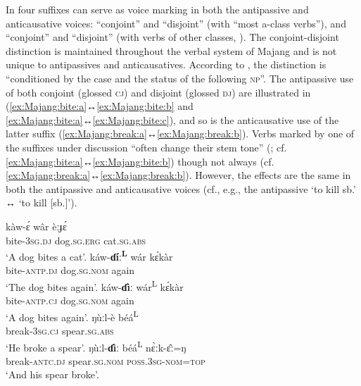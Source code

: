 In  four suffixes can serve as voice marking in both the antipassive and anticausative voices: “conjoint”  and “disjoint”  (with “most a-class verbs”), and “conjoint”  and “disjoint”  (with verbs of other  classes, \citealt[227]{joswig:2019}). The conjoint-disjoint distinction is maintained throughout the verbal system of Majang and is not unique to antipassives and anticausatives. According to \cite[132]{joswig:2019}, the distinction is “conditioned by the case and the  status of the following \textsc{np}”. The antipassive use of both conjoint  (glossed \textsc{cj}) and disjoint  (glossed \textsc{dj}) are illustrated in (\ref{ex:Majang:bite:a}↔\ref{ex:Majang:bite:b} and \ref{ex:Majang:bite:a}↔\ref{ex:Majang:bite:c}), and so is the anticausative use of the latter suffix (\ref{ex:Majang:break:a}↔\ref{ex:Majang:break:b}). Verbs marked by one of the suffixes under discussion “often change their stem tone” (\citealt[229]{joswig:2019}; cf. \ref{ex:Majang:bite:a}↔\ref{ex:Majang:bite:b}) though not always (cf. \ref{ex:Majang:break:a}↔\ref{ex:Majang:break:b}). However, the effects are the same in both the antipassive and anticausative voices (cf., e.g., the antipassive   ‘to kill sb.’ ↔  ‘to kill [sb.]’). 

\ea {} \citep[228, 361]{joswig:2019}
\ea\label{ex:Majang:bite:a}
	\gll	kàw-ɛ́ wâr èːɟɛ́ \\
			bite-\textsc{3sg.dj} dog.\textsc{sg.erg} cat.\textsc{sg.abs} \\
	\glt	‘A dog bites a cat’.
\ex\label{ex:Majang:bite:b}
	\gll	káw-\textbf{ɗíː\textsuperscript{L}} wár kɛ́kàr \\
			bite-\textsc{antp.dj} dog.\textsc{sg.nom} again \\
	\glt	‘The dog bites again’.
\ex\label{ex:Majang:bite:c}
	\gll	káw-\textbf{ɗìː} wár\textsuperscript{L} kɛ́kàr \\
			bite-\textsc{antp.cj} dog.\textsc{sg.nom} again \\
	\glt	‘A dog bites again’.
\ex\label{ex:Majang:break:a}
	\gll	ŋùːl-è béá\textsuperscript{L} \\
			break-\textsc{3sg.cj} spear.\textsc{sg.abs} \\
	\glt	‘He broke a spear’.
\ex\label{ex:Majang:break:b}
	\gll	ŋùːl-\textbf{ɗìː} béá\textsuperscript{L} nɛ̀ːk-ɛ̂ː=ŋ \\
			break-\textsc{antc.dj} spear.\textsc{sg.nom} \textsc{poss.3sg-nom=top} \\
	\glt	‘And his spear broke’.
	\z 
\z

